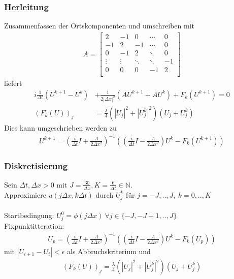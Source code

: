 \documentclass{beamer}
\begin{document}
\begin{frame}
    \frametitle{Herleitung}

    Zusammenfassen der Ortskomponenten und umschreiben mit 
    \begin{align*}
        A = \begin{bmatrix}
            2  & -1 &  0  &  \cdots  & 0 \\
            -1  & 2 &  -1  &  \cdots  & 0 \\
            0  & -1 &  2  &  \ddots  & 0 \\
            \vdots & \vdots & \ddots & \ddots & -1 \\
            0 & 0 & 0 & -1 & 2\\
        \end{bmatrix}
    \end{align*}
    liefert
    \begin{align*}
        i\frac{1}{\Delta t}(U^{k+1}-U^k)&+\frac{1}{2|\Delta x|^2}(AU^{k+1}+AU^k)+F_k(U^{k+1})=0\\
        (F_k(U))_j &= \frac{\lambda}{4}(|U_j|^2+|U_j^k|^2)(U_j+U_j^k)
    \end{align*}
    Dies kann umgeschrieben werden zu
    \begin{align*}
        U^{k+1} = (\frac{i}{\Delta t}I + \frac{A}{2\Delta x^2})^{-1}((\frac{i}{\Delta t}I - \frac{A}{2\Delta x^2})U^k - F_k(U^{k+1}))
    \end{align*}

\end{frame}

\begin{frame}
    \frametitle{Diskretisierung}

    Sein $\Delta t, \Delta x>0$ mit $J=\frac{30}{\Delta x},K=\frac{6}{\Delta t}\in\mathbb{N}$.\\
    Approximiere $u(j\Delta x, k\Delta t)$ durch $U_j^k$ f\"ur $j=-J, .. , J,\ k=0, .. , K$\\
    \ \\
    Startbedingung: $U_j^0=\phi(j\Delta x)\ \forall j\in\{-J, -J+1, .., J\}$\\
    Fixpunktitteration:
    \begin{align*}
        U_p = (\frac{i}{\Delta t}I + \frac{A}{2\Delta x^2})^{-1}((\frac{i}{\Delta t}I - \frac{A}{2\Delta x^2})U^k - F_k(U_p))
    \end{align*}
    mit $| U_{i+1}-U_{i} |<\epsilon$ als Abbruchskriterium und
    \begin{align*}
        (F_k(U))_j = \frac{\lambda}{4}(|U_j|^2+|U_j^k|^2)(U_j+U_j^k)
    \end{align*}
\end{frame}
\end{document}
